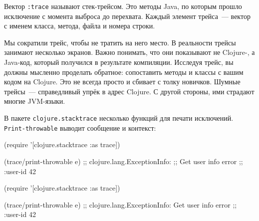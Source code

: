 \else

\begin{english}
\end{english}

\fi


Вектор \verb|:trace| называют стек-трейсом. Это методы Java, по которым прошло
исключение с момента выброса до перехвата. Каждый элемент трейса~--- вектор с
именем класса, метода, файла и номера строки.

Мы сократили трейс, чтобы не тратить на него место. В реальности трейсы занимают
несколько экранов. Важно понимать, что они показывают не Clojure-, а Java-код,
который получился в результате компиляции. Исследуя трейс, вы должны мысленно
проделать обратное: сопоставить методы и классы с вашим кодом на Clojure. Это не
всегда просто и сбивает с толку новичков. Шумные трейсы~--- справедливый упрёк
в адрес Clojure. С другой стороны, ими страдают многие JVM-языки.


В пакете \verb|clojure.stacktrace| несколько функций для печати
исключений. \verb|Print-throwable| выводит сообщение и контекст:

\ifnarrow

\begin{english}
  \begin{clojure}
(require '[clojure.stacktrace :as trace])

(trace/print-throwable e)
;; clojure.lang.ExceptionInfo:
;; Get user info error
;; {:user-id 42}
  \end{clojure}
\end{english}

\else

\begin{english}
  \begin{clojure}
(require '[clojure.stacktrace :as trace])

(trace/print-throwable e)
;; clojure.lang.ExceptionInfo: Get user info error
;; {:user-id 42}
  \end{clojure}
\end{english}

